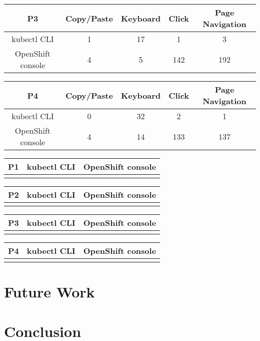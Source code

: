 \documentclass[11pt, oneside]{article}   	%
\begin{document}
\begin{center}
\begin{tabular}{ | c | c | c | c | c | } 
  \hline
  P3 & Copy/Paste & Keyboard & Click & Page Navigation \\ 
  \hline
  kubectl CLI & 1 & 17 & 1 & 3 \\ 
  \hline
  OpenShift console & 4 & 5 & 142 & 192 \\ 
  \hline
\end{tabular}
\end{center}

\begin{center}
\begin{tabular}{ | c | c | c | c | c | } 
  \hline
  P4 & Copy/Paste & Keyboard & Click & Page Navigation \\ 
  \hline
  kubectl CLI & 0 & 32 & 2 & 1 \\ 
  \hline
  OpenShift console & 4 & 14 & 133 & 137 \\ 
  \hline
\end{tabular}
\end{center}

\begin{center}
\begin{tabular}{ | c | c | c | } 
  \hline
  P1 & kubectl CLI & OpenShift console \\ 
  \hline
   &  &  \\ 
  \hline
\end{tabular}
\end{center}

\begin{center}
\begin{tabular}{ | c | c | c | } 
  \hline
  P2 & kubectl CLI & OpenShift console \\ 
  \hline
   &  &  \\ 
  \hline
\end{tabular}
\end{center}

\begin{center}
\begin{tabular}{ | c | c | c | } 
  \hline
  P3 & kubectl CLI & OpenShift console \\ 
  \hline
   &  &  \\ 
  \hline
\end{tabular}
\end{center}

\begin{center}
\begin{tabular}{ | c | c | c | } 
  \hline
  P4 & kubectl CLI & OpenShift console \\ 
  \hline
   &  &  \\ 
  \hline
\end{tabular}
\end{center}

\section{Future Work}

\section{Conclusion}
\end{document}
